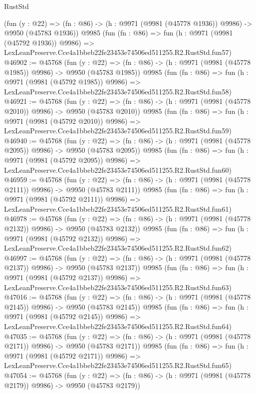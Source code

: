 \begin{lexlean}{RustStd}
\begin{coremodule}
    (fun (y : @22) =>
    (fn : @86) -> (h : @9971 (@9981 (@45778 @1936)) @9986) -> @9950 (@45783 @1936))
    @9985
    (fun (fn : @86) =>
    fun (h : @9971 (@9981 (@45792 @1936)) @9986) =>
    LexLeanPreserve.Cce4a1bbeb22fe23453e74506ed511255.R2.RustStd.fun57)
@46902 := @45768
    (fun (y : @22) =>
    (fn : @86) -> (h : @9971 (@9981 (@45778 @1985)) @9986) -> @9950 (@45783 @1985))
    @9985
    (fun (fn : @86) =>
    fun (h : @9971 (@9981 (@45792 @1985)) @9986) =>
    LexLeanPreserve.Cce4a1bbeb22fe23453e74506ed511255.R2.RustStd.fun58)
@46921 := @45768
    (fun (y : @22) =>
    (fn : @86) -> (h : @9971 (@9981 (@45778 @2010)) @9986) -> @9950 (@45783 @2010))
    @9985
    (fun (fn : @86) =>
    fun (h : @9971 (@9981 (@45792 @2010)) @9986) =>
    LexLeanPreserve.Cce4a1bbeb22fe23453e74506ed511255.R2.RustStd.fun59)
@46940 := @45768
    (fun (y : @22) =>
    (fn : @86) -> (h : @9971 (@9981 (@45778 @2095)) @9986) -> @9950 (@45783 @2095))
    @9985
    (fun (fn : @86) =>
    fun (h : @9971 (@9981 (@45792 @2095)) @9986) =>
    LexLeanPreserve.Cce4a1bbeb22fe23453e74506ed511255.R2.RustStd.fun60)
@46959 := @45768
    (fun (y : @22) =>
    (fn : @86) -> (h : @9971 (@9981 (@45778 @2111)) @9986) -> @9950 (@45783 @2111))
    @9985
    (fun (fn : @86) =>
    fun (h : @9971 (@9981 (@45792 @2111)) @9986) =>
    LexLeanPreserve.Cce4a1bbeb22fe23453e74506ed511255.R2.RustStd.fun61)
@46978 := @45768
    (fun (y : @22) =>
    (fn : @86) -> (h : @9971 (@9981 (@45778 @2132)) @9986) -> @9950 (@45783 @2132))
    @9985
    (fun (fn : @86) =>
    fun (h : @9971 (@9981 (@45792 @2132)) @9986) =>
    LexLeanPreserve.Cce4a1bbeb22fe23453e74506ed511255.R2.RustStd.fun62)
@46997 := @45768
    (fun (y : @22) =>
    (fn : @86) -> (h : @9971 (@9981 (@45778 @2137)) @9986) -> @9950 (@45783 @2137))
    @9985
    (fun (fn : @86) =>
    fun (h : @9971 (@9981 (@45792 @2137)) @9986) =>
    LexLeanPreserve.Cce4a1bbeb22fe23453e74506ed511255.R2.RustStd.fun63)
@47016 := @45768
    (fun (y : @22) =>
    (fn : @86) -> (h : @9971 (@9981 (@45778 @2145)) @9986) -> @9950 (@45783 @2145))
    @9985
    (fun (fn : @86) =>
    fun (h : @9971 (@9981 (@45792 @2145)) @9986) =>
    LexLeanPreserve.Cce4a1bbeb22fe23453e74506ed511255.R2.RustStd.fun64)
@47035 := @45768
    (fun (y : @22) =>
    (fn : @86) -> (h : @9971 (@9981 (@45778 @2171)) @9986) -> @9950 (@45783 @2171))
    @9985
    (fun (fn : @86) =>
    fun (h : @9971 (@9981 (@45792 @2171)) @9986) =>
    LexLeanPreserve.Cce4a1bbeb22fe23453e74506ed511255.R2.RustStd.fun65)
@47054 := @45768
    (fun (y : @22) =>
    (fn : @86) -> (h : @9971 (@9981 (@45778 @2179)) @9986) -> @9950 (@45783 @2179))

\end{coremodule}
\end{lexlean}
